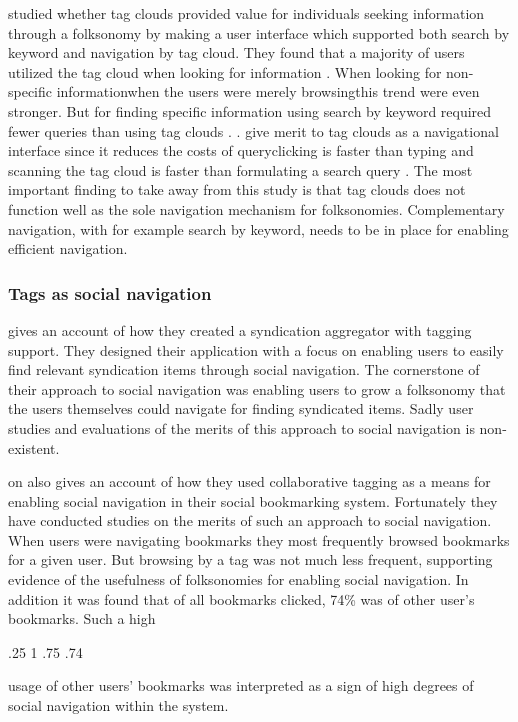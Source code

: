 \citet[]{sinclair08} studied whether tag clouds provided
value for individuals seeking information through a folksonomy by making a
user interface which supported both search by keyword and navigation by tag
cloud. They found that a majority of users utilized the
tag cloud when looking for information \citeyearpar[]{sinclair08}.
When looking for non-specific information\dash{}when the users were merely
browsing\dash{}this trend were even stronger. But for finding specific
information using  search by keyword required fewer queries than using tag
clouds \citeyearpar[]{sinclair08}. \citeauthor{sinclair08}.
give merit to tag clouds as a navigational interface since it
reduces the costs of query\dash{}clicking is faster than typing and scanning
the tag cloud is faster than formulating a search query
\citeyearpar[]{sinclair08}. The most important finding to take away from
this study is that tag clouds does not function well as the sole navigation
mechanism for folksonomies. Complementary navigation, with for example search
by keyword, needs to be in place for enabling efficient navigation.

\subsubsection{Tags as social navigation}

\citet{jarrett05} gives an account of how they created a syndication
aggregator with tagging support. They designed their application with a focus
on enabling users to easily find relevant syndication items through
social navigation. The cornerstone of their approach to social navigation was
enabling users to grow a folksonomy that the users themselves could navigate
for finding syndicated items. Sadly user studies and evaluations
of the merits of this approach to social navigation is non-existent.

\citet{millen06} on also gives an account of how they used collaborative
tagging as a means for enabling social navigation in their
 social bookmarking system. Fortunately they have conducted
studies on the merits of such an approach to social navigation. When users
were navigating bookmarks they most frequently browsed bookmarks for a given
user. But browsing by a tag was not much less frequent, supporting evidence of
the usefulness of folksonomies for enabling social navigation. In addition
it was found that of all bookmarks clicked, 74\% was of other user's
bookmarks. Such a high
\begin{sparkline}{3}
  \sparkspike .25  1
  \sparkspike .75  .74
\end{sparkline}
usage of other users' bookmarks was interpreted as a sign of high degrees of
social navigation within the system.

